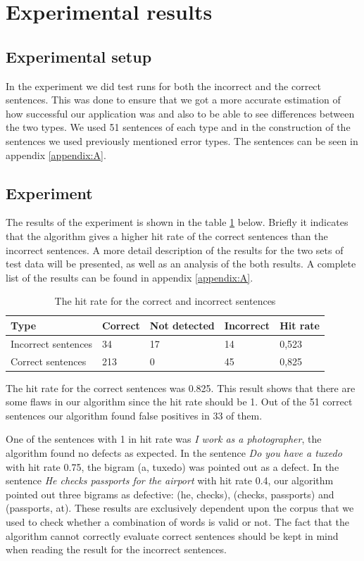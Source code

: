 \documentclass[a4paper,12pt]{article}
\begin{document}
\section{Experimental results}
\label{sec:experimentalresults}

\subsection{Experimental setup}
In the experiment we did test runs for both the incorrect and the correct sentences. This was done to ensure that we got a more accurate estimation of how successful our application was and also to be able to see differences between the two types. We used 51 sentences of each type and in the construction of the sentences we used previously mentioned error types. The sentences can be seen in appendix \ref{appendix:A}.

\subsection{Experiment}
The results of the experiment is shown in the table \ref{table:results} below. Briefly it indicates that the algorithm gives a higher hit rate of the correct sentences than the incorrect sentences. A more detail description of the results for the two sets of test data will be presented, as well as an analysis of the both results. A complete list of the results can be found in appendix \ref{appendix:A}.

\begin{table}[h]
\begin{center}
\begin{tabular}{lllll}
\hline
Type & Correct & Not detected & Incorrect & Hit rate \\
\hline
Incorrect sentences & 34 & 17 & 14 & 0,523  \\
Correct sentences & 213 & 0 & 45 & 0,825  \\
\hline
\end{tabular}
\caption[Table caption text]{The hit rate for the correct and incorrect sentences}
\label{table:results}
\end{center}
\end{table}

The hit rate for the correct sentences was 0.825. This result shows that there are some flaws in our algorithm since the hit rate should be 1. Out of the 51 correct sentences our algorithm found false positives in 33 of them.

One of the sentences with 1 in hit rate was \emph{I work as a photographer}, the algorithm found no defects as expected. In the sentence \emph{Do you have a tuxedo} with hit rate 0.75, the bigram (a, tuxedo) was pointed out as a defect. In the sentence \emph{He checks passports for the airport} with hit rate 0.4, our algorithm pointed out three bigrams as defective: (he, checks), (checks, passports) and (passports, at). These results are exclusively dependent upon the corpus that we used to check whether a combination of words is valid or not. The fact that the algorithm cannot correctly evaluate correct sentences should be kept in mind when reading the result for the incorrect sentences.
\end{document}
